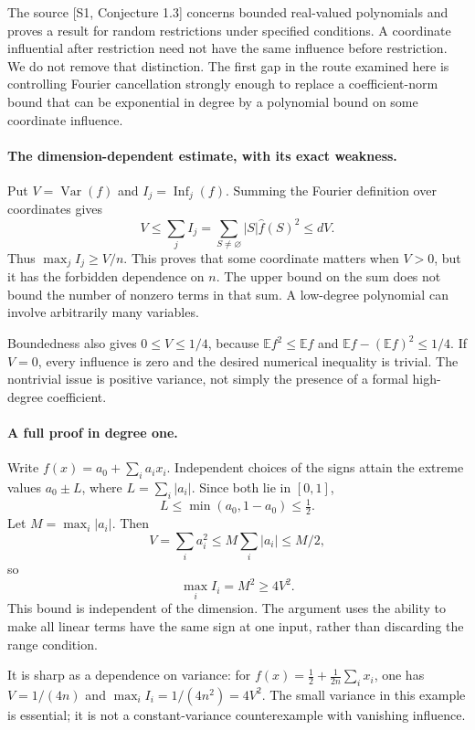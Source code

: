 \documentclass[11pt]{article}
\begin{document}
The source [S1, Conjecture 1.3] concerns bounded real-valued polynomials and proves a result for random restrictions under specified conditions. A coordinate influential after restriction need not have the same influence before restriction. We do not remove that distinction. The first gap in the route examined here is controlling Fourier cancellation strongly enough to replace a coefficient-norm bound that can be exponential in degree by a polynomial bound on some coordinate influence.

\paragraph{The dimension-dependent estimate, with its exact weakness.}
Put $V=\operatorname{Var}(f)$ and $I_j=\operatorname{Inf}_j(f)$. Summing the Fourier definition over coordinates gives
\[
 V\le\sum_j I_j
    =\sum_{S\ne\varnothing}|S|\widehat f(S)^2
    \le dV.
 \tag{443.1}
\]
Thus $\max_j I_j\ge V/n$. This proves that some coordinate matters when $V>0$, but it has the forbidden dependence on $n$. The upper bound on the sum does not bound the number of nonzero terms in that sum. A low-degree polynomial can involve arbitrarily many variables.

Boundedness also gives $0\le V\le1/4$, because
$\mathbb E f^2\le\mathbb E f$ and
$\mathbb E f-(\mathbb E f)^2\le1/4$. If $V=0$, every influence is zero and the desired numerical inequality is trivial. The nontrivial issue is positive variance, not simply the presence of a formal high-degree coefficient.

\paragraph{A full proof in degree one.}
Write $f(x)=a_0+\sum_i a_i x_i$. Independent choices of the signs attain the extreme values $a_0\pm L$, where $L=\sum_i|a_i|$. Since both lie in $[0,1]$,
\[
 L\le\min(a_0,1-a_0)\le\tfrac12.
\]
Let $M=\max_i|a_i|$. Then
\[
 V=\sum_i a_i^2\le M\sum_i|a_i|\le M/2,
\]
so
\[
 \max_i I_i=M^2\ge4V^2.
 \tag{443.2}
\]
This bound is independent of the dimension. The argument uses the ability to make all linear terms have the same sign at one input, rather than discarding the range condition.

It is sharp as a dependence on variance: for
$f(x)=\tfrac12+\frac1{2n}\sum_i x_i$, one has
$V=1/(4n)$ and $\max_i I_i=1/(4n^2)=4V^2$.
The small variance in this example is essential; it is not a constant-variance counterexample with vanishing influence.
\end{document}

